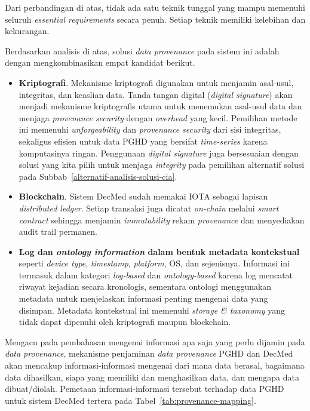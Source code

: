 Dari perbandingan di atas, tidak ada satu teknik tunggal yang mampu memenuhi seluruh \textit{essential requirements} secara penuh. 
Setiap teknik memiliki kelebihan dan kekurangan.

Berdasarkan analisis di atas, solusi \textit{data provenance} pada sistem ini adalah dengan mengkombinasikan empat kandidat berikut.

\begin{itemize}
    \item \textbf{Kriptografi}. Mekanisme kriptografi digunakan untuk menjamin asal-usul, integritas, dan keaslian data.
    Tanda tangan digital (\textit{digital signature}) akan menjadi mekanisme kriptografis utama untuk menemukan asal-usul data dan menjaga \textit{provenance security} dengan \textit{overhead} yang kecil. 
    Pemilihan metode ini memenuhi \textit{unforgeability} dan \textit{provenance security} dari sisi integritas, sekaligus efisien untuk data PGHD yang bersifat \textit{time-series} karena komputasinya ringan.
    Penggunaan \textit{digital signature} juga bersesuaian dengan solusi yang kita pilih untuk menjaga \textit{integrity} pada pemilihan alternatif solusi pada Subbab~\ref{alternatif-analisis-solusi-cia}.

    \item \textbf{Blockchain}. Sistem DecMed sudah memakai IOTA sebagai lapisan \textit{distributed ledger}.
    Setiap transaksi juga dicatat \textit{on-chain} melalui \textit{smart contract} sehingga menjamin \textit{immutability} rekam \textit{provenance} dan menyediakan audit trail permanen.

    \item \textbf{Log dan \textit{ontology information} dalam bentuk metadata kontekstual} seperti \textit{device type}, \textit{timestamp}, \textit{platform}, OS, dan sejenisnya. 
    Informasi ini termasuk dalam kategori \textit{log-based} dan \textit{ontology-based} karena log mencatat riwayat kejadian secara kronologis, sementara ontologi menggunakan metadata untuk menjelaskan informasi penting mengenai data yang disimpan. 
    Metadata kontekstual ini memenuhi \textit{storage \& taxonomy} yang tidak dapat dipenuhi oleh kriptografi maupun blockchain.
\end{itemize}

Mengacu pada pembahasan mengenai informasi apa saja yang perlu dijamin pada \textit{data provenance}, mekanisme penjaminan \textit{data provenance} PGHD dan DecMed akan mencakup informasi-informasi mengenai dari mana data berasal, bagaimana data dihasilkan, siapa yang memiliki dan menghasilkan data, dan mengapa data dibuat/diolah.
Pemetaan informasi-informasi tersebut terhadap data PGHD untuk sistem DecMed tertera pada Tabel~\ref{tab:provenance-mapping}.

